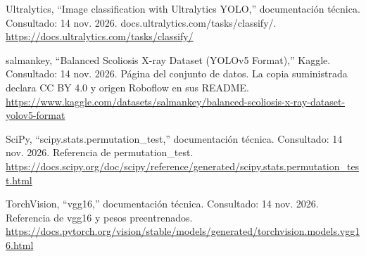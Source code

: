 \documentclass[conference]{IEEEtran}
\begin{document}
\par\medskip
[9] Ultralytics, “Image classification with Ultralytics YOLO,” documentación técnica. Consultado: 14 nov. 2026. docs.ultralytics.com/tasks/classify/. \url{https://docs.ultralytics.com/tasks/classify/}
\par\medskip
[10] salmankey, “Balanced Scoliosis X-ray Dataset (YOLOv5 Format),” Kaggle. Consultado: 14 nov. 2026. Página del conjunto de datos. La copia suministrada declara CC BY 4.0 y origen Roboflow en sus README. \url{https://www.kaggle.com/datasets/salmankey/balanced-scoliosis-x-ray-dataset-yolov5-format}
\par\medskip
[11] SciPy, “scipy.stats.permutation\_test,” documentación técnica. Consultado: 14 nov. 2026. Referencia de permutation\_test. \url{https://docs.scipy.org/doc/scipy/reference/generated/scipy.stats.permutation_test.html}
\par\medskip
[12] TorchVision, “vgg16,” documentación técnica. Consultado: 14 nov. 2026. Referencia de vgg16 y pesos preentrenados. \url{https://docs.pytorch.org/vision/stable/models/generated/torchvision.models.vgg16.html}
\par\medskip
\end{document}
